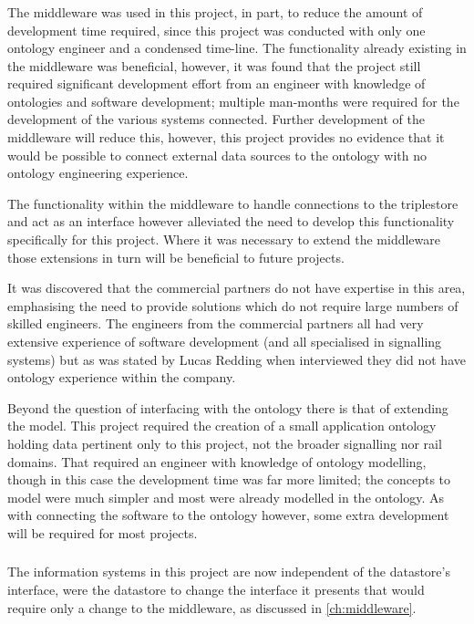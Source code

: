 \begin{minipage}{\textwidth}
\subsubsection*{\textit{\QuestionSkillz}} 
The middleware was used in this project, in part, to reduce the amount of development time required, since this project was conducted with only one ontology engineer and a condensed time-line. The functionality already existing in the middleware was beneficial, however, it was found that the project still required significant development effort from an engineer with knowledge of ontologies and software development; multiple man-months were required for the development of the various systems connected. Further development of the middleware will reduce this, however, this project provides no evidence that it would be possible to connect external data sources to the ontology with no ontology engineering experience. 

The functionality within the middleware to handle connections to the triplestore and act as an interface however alleviated the need to develop this functionality specifically for this project. Where it was necessary to extend the middleware those extensions in turn will be beneficial to future projects. 
\end{minipage}
It was discovered that the commercial partners do not have expertise in this area, emphasising the need to provide solutions which do not require large numbers of skilled engineers. The engineers from the commercial partners all had very extensive experience of software development (and all specialised in signalling systems) but as was stated by Lucas Redding when interviewed they did not have ontology experience within the company. 

Beyond the question of interfacing with the ontology there is that of extending the model. This project required the creation of a small application ontology holding data pertinent only to this project, not the broader signalling nor rail domains. That required an engineer with knowledge of ontology modelling, though in this case the development time was far more limited; the concepts to model were much simpler and most were already modelled in the ontology. As with connecting the software to the ontology however, some extra development will be required for most projects.

\begin{minipage}{\textwidth}
\subsubsection*{\textit{\QuestionChange}} 
The information systems in this project are now independent of the datastore's interface, were the datastore to change the interface it presents that would require only a change to the middleware, as discussed in \autoref{ch:middleware}.
\end{minipage}

